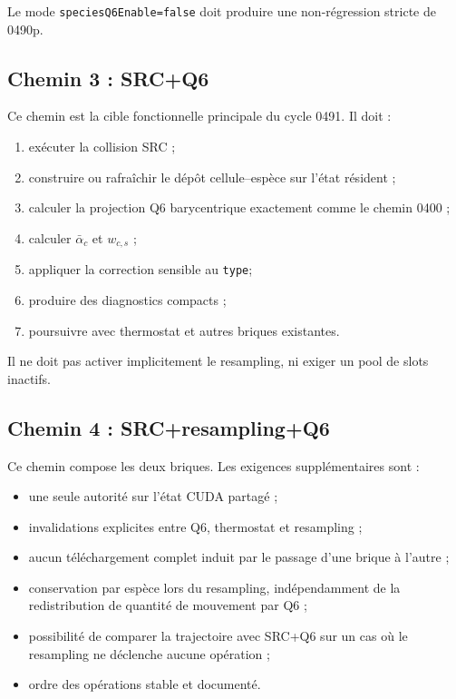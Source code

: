 \documentclass[11pt,a4paper]{article}
\newcommand{\code}[1]{\texttt{#1}}
\begin{document}
Le mode \code{speciesQ6Enable=false} doit produire une non-régression stricte de 0490p.

\subsection{Chemin 3 : SRC+Q6}

Ce chemin est la cible fonctionnelle principale du cycle 0491. Il doit :
\begin{enumerate}
  \item exécuter la collision SRC ;
  \item construire ou rafraîchir le dépôt cellule--espèce sur l'état résident ;
  \item calculer la projection Q6 barycentrique exactement comme le chemin 0400 ;
  \item calculer \(\bar\alpha_c\) et \(w_{c,s}\) ;
  \item appliquer la correction sensible au \code{type};
  \item produire des diagnostics compacts ;
  \item poursuivre avec thermostat et autres briques existantes.
\end{enumerate}

Il ne doit pas activer implicitement le resampling, ni exiger un pool de slots inactifs.

\subsection{Chemin 4 : SRC+resampling+Q6}

Ce chemin compose les deux briques. Les exigences supplémentaires sont :
\begin{itemize}
  \item une seule autorité sur l'état CUDA partagé ;
  \item invalidations explicites entre Q6, thermostat et resampling ;
  \item aucun téléchargement complet induit par le passage d'une brique à l'autre ;
  \item conservation par espèce lors du resampling, indépendamment de la redistribution de quantité de mouvement par Q6 ;
  \item possibilité de comparer la trajectoire avec SRC+Q6 sur un cas où le resampling ne déclenche aucune opération ;
  \item ordre des opérations stable et documenté.
\end{itemize}
\end{document}

